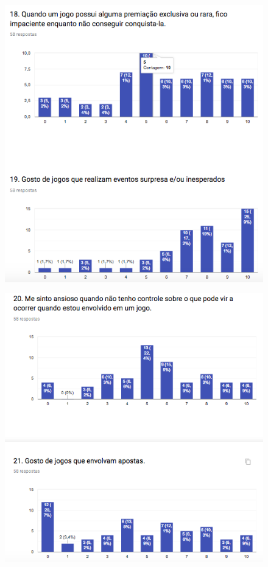 \begin{apendicesenv}
\begin{figure}[h]
	\centering
	\includegraphics[keepaspectratio=true,scale=1]{figuras/r15.png}
\end{figure}


\begin{figure}[h]
	\centering
	\includegraphics[keepaspectratio=true,scale=1]{figuras/r16.png}
\end{figure}



\end{apendicesenv}
